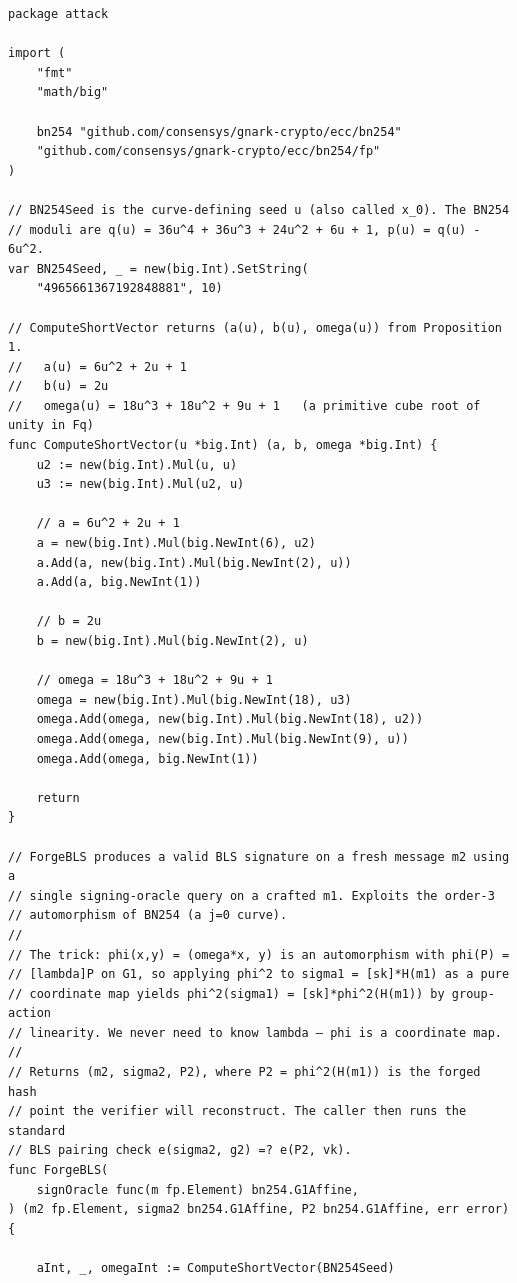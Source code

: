 \documentclass[11pt,a4paper]{article}
\theoremstyle{definition}
\begin{document}
\begin{lstlisting}[caption={BN254 algebraic attack: building the short
vector and forging a signature.}, label={lst:attack-go}]
package attack

import (
    "fmt"
    "math/big"

    bn254 "github.com/consensys/gnark-crypto/ecc/bn254"
    "github.com/consensys/gnark-crypto/ecc/bn254/fp"
)

// BN254Seed is the curve-defining seed u (also called x_0). The BN254
// moduli are q(u) = 36u^4 + 36u^3 + 24u^2 + 6u + 1, p(u) = q(u) - 6u^2.
var BN254Seed, _ = new(big.Int).SetString(
    "4965661367192848881", 10)

// ComputeShortVector returns (a(u), b(u), omega(u)) from Proposition 1.
//   a(u) = 6u^2 + 2u + 1
//   b(u) = 2u
//   omega(u) = 18u^3 + 18u^2 + 9u + 1   (a primitive cube root of unity in Fq)
func ComputeShortVector(u *big.Int) (a, b, omega *big.Int) {
    u2 := new(big.Int).Mul(u, u)
    u3 := new(big.Int).Mul(u2, u)

    // a = 6u^2 + 2u + 1
    a = new(big.Int).Mul(big.NewInt(6), u2)
    a.Add(a, new(big.Int).Mul(big.NewInt(2), u))
    a.Add(a, big.NewInt(1))

    // b = 2u
    b = new(big.Int).Mul(big.NewInt(2), u)

    // omega = 18u^3 + 18u^2 + 9u + 1
    omega = new(big.Int).Mul(big.NewInt(18), u3)
    omega.Add(omega, new(big.Int).Mul(big.NewInt(18), u2))
    omega.Add(omega, new(big.Int).Mul(big.NewInt(9), u))
    omega.Add(omega, big.NewInt(1))

    return
}

// ForgeBLS produces a valid BLS signature on a fresh message m2 using a
// single signing-oracle query on a crafted m1. Exploits the order-3
// automorphism of BN254 (a j=0 curve).
//
// The trick: phi(x,y) = (omega*x, y) is an automorphism with phi(P) =
// [lambda]P on G1, so applying phi^2 to sigma1 = [sk]*H(m1) as a pure
// coordinate map yields phi^2(sigma1) = [sk]*phi^2(H(m1)) by group-action
// linearity. We never need to know lambda — phi is a coordinate map.
//
// Returns (m2, sigma2, P2), where P2 = phi^2(H(m1)) is the forged hash
// point the verifier will reconstruct. The caller then runs the standard
// BLS pairing check e(sigma2, g2) =? e(P2, vk).
func ForgeBLS(
    signOracle func(m fp.Element) bn254.G1Affine,
) (m2 fp.Element, sigma2 bn254.G1Affine, P2 bn254.G1Affine, err error) {

    aInt, _, omegaInt := ComputeShortVector(BN254Seed)


\end{lstlisting}
\end{document}
